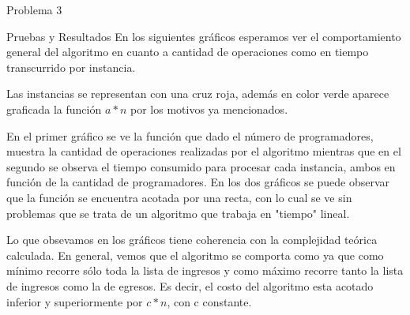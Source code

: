 \begin{section}{Problema 3}
\begin{subsection}{Pruebas y Resultados}
	En los siguientes gráficos esperamos ver el comportamiento general del algoritmo en cuanto a cantidad de operaciones como en tiempo transcurrido por instancia.
	
	Las instancias se representan con una cruz roja, además en color verde aparece graficada la función $a*n$ por los motivos ya mencionados.

	\VSP	
	
	\VSP

	En el primer gráfico se ve la función que dado el número de programadores, muestra la cantidad de operaciones realizadas por el algoritmo mientras que en el segundo se observa el tiempo consumido para procesar cada instancia, ambos en función de la cantidad de programadores.
	En los dos gráficos se puede observar que la función se encuentra acotada por una recta, con lo cual se ve sin problemas que se trata de un algoritmo que trabaja en "tiempo" lineal.

	Lo que obsevamos en los gráficos tiene coherencia con la complejidad teórica calculada. 
	En general, vemos que el algoritmo se comporta como  ya que como mínimo recorre sólo toda la lista de ingresos y como máximo recorre tanto la lista de ingresos como la de egresos. Es decir, el costo del algoritmo esta acotado inferior y superiormente por $c*n$, con c constante.

	\end{subsection}

\end{section}







